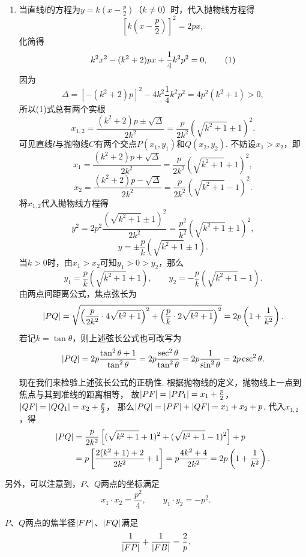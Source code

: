 \begin{example}
\begin{enumerate}
	\item 当直线\(l\)的方程为\(y=k\left(x-\frac{p}{2}\right)\)（\(k\neq0\)）时，代入抛物线方程得\[
		\left[k \left(x-\frac{p}{2}\right)\right]^2 = 2px,
	\]
	化简得\begin{gather}
		k^2 x^2 - (k^2 + 2)px + \frac{1}{4} k^2 p^2 = 0, \tag1
	\end{gather}
	因为\[
		\Delta = [- (k^2 + 2)p]^2 - 4 k^2 \frac{1}{4} k^2 p^2
		= 4 p^2 (k^2 + 1) > 0,
	\]
	所以(1)式总有两个实根\[
		x_{1,2} = \frac{(k^2+2)p \pm \sqrt\Delta}{2 k^2}
		= \frac{p}{2 k^2} (\sqrt{k^2+1} \pm 1)^2.
	\]
	可见直线\(l\)与抛物线\(C\)有两个交点\(P(x_1,y_1)\)和\(Q(x_2,y_2)\).
	不妨设\(x_1 > x_2\)，即\[
		x_1 = \frac{(k^2+2)p + \sqrt\Delta}{2 k^2}
		= \frac{p}{2 k^2} (\sqrt{k^2+1} + 1)^2,
	\]\[
		x_2 = \frac{(k^2+2)p - \sqrt\Delta}{2 k^2}
		= \frac{p}{2 k^2} (\sqrt{k^2+1} - 1)^2.
	\]
	将\(x_{1,2}\)代入抛物线方程得\[
		y^2 = 2 p^2 \frac{(\sqrt{k^2+1}\pm1)^2}{2 k^2}
		= \frac{p^2}{k^2} (\sqrt{k^2+1}\pm1)^2,
	\]\[
		y = \pm \frac{p}{k} (\sqrt{k^2+1}\pm1).
	\]
	当\(k>0\)时，由\(x_1 > x_2\)可知\(y_1 > 0 > y_2\)，那么\[
		y_1 = \frac{p}{k} (\sqrt{k^2+1}+1),
		\qquad
		y_2 = -\frac{p}{k} (\sqrt{k^2+1}-1).
	\]
	由两点间距离公式，焦点弦长为\begin{equation}
		\abs{PQ} = \sqrt{
		\left(\frac{p}{2 k^2} \cdot 4 \sqrt{k^2+1}\right)^2
		+\left(\frac{p}{k} \cdot 2 \sqrt{k^2+1}\right)^2
		} = 2p \left(1+\frac{1}{k^2}\right).
	\end{equation}
	若记\(k=\tan\theta\)，则上述弦长公式也可改写为\begin{equation}
		\abs{PQ} = 2p \frac{\tan^2\theta+1}{\tan^2\theta}
		= 2p \frac{\sec^2\theta}{\tan^2\theta}
		= 2p \frac{1}{\sin^2\theta}
		= 2p \csc^2\theta.
	\end{equation}

	现在我们来检验上述弦长公式的正确性.
	根据抛物线的定义，抛物线上一点到焦点与其到准线的距离相等，
	故\(\abs{PF} = \abs{P P_1} = x_1 + \frac{p}{2}\)，
	\(\abs{QF} = \abs{Q Q_1} = x_2 + \frac{p}{2}\)，
	那么\(\abs{PQ} = \abs{PF}+\abs{QF} = x_1 + x_2 + p\).
	代入\(x_{1,2}\)，得\begin{align*}
		\abs{PQ} &= \frac{p}{2 k^2} \left[(\sqrt{k^2+1} + 1)^2 + (\sqrt{k^2+1} - 1)^2\right] + p \\
		&= p\left[\frac{2(k^2 + 1) + 2}{2 k^2} + 1\right]
		= p \frac{4k^2 + 4}{2k^2}
		= 2p \left(1+\frac{1}{k^2}\right).
	\end{align*}
\end{enumerate}

另外，可以注意到，\(P\)、\(Q\)两点的坐标满足\begin{equation}
	x_1 \cdot x_2 = \frac{p^2}{4},
	\qquad
	y_1 \cdot y_2 = -p^2.
\end{equation}

\(P\)、\(Q\)两点的焦半径\(\abs{FP}\)、\(\abs{FQ}\)满足\begin{equation}
	\frac{1}{\abs{FP}} + \frac{1}{\abs{FB}}
	= \frac{2}{p}.
\end{equation}
\end{example}


